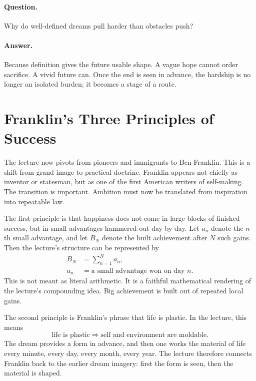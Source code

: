 \paragraph{Question.} Why do well-defined dreams pull harder than obstacles push?

\paragraph{Answer.} Because definition gives the future usable shape. A vague hope cannot order sacrifice. A vivid future can. Once the end is seen in advance, the hardship is no longer an isolated burden; it becomes a stage of a route.

\section{Franklin's Three Principles of Success}

The lecture now pivots from pioneers and immigrants to Ben Franklin. This is a shift from grand image to practical doctrine. Franklin appears not chiefly as inventor or statesman, but as one of the first American writers of self-making. The transition is important. Ambition must now be translated from inspiration into repeatable law.

The first principle is that happiness does not come in large blocks of finished success, but in small advantages hammered out day by day. Let \(a_n\) denote the \(n\)-th small advantage, and let \(B_N\) denote the built achievement after \(N\) such gains. Then the lecture's structure can be represented by
\begin{align}
B_N &= \sum_{n=1}^{N} a_n,\\
a_n &= \text{a small advantage won on day }n.
\end{align}
This is not meant as literal arithmetic. It is a faithful mathematical rendering of the lecture's compounding idea. Big achievement is built out of repeated local gains.

The second principle is Franklin's phrase that life is plastic. In the lecture, this means
\begin{equation}
\text{life is plastic}\Rightarrow \text{self and environment are moldable}.
\end{equation}
The dream provides a form in advance, and then one works the material of life every minute, every day, every month, every year. The lecture therefore connects Franklin back to the earlier dream imagery: first the form is seen, then the material is shaped.

